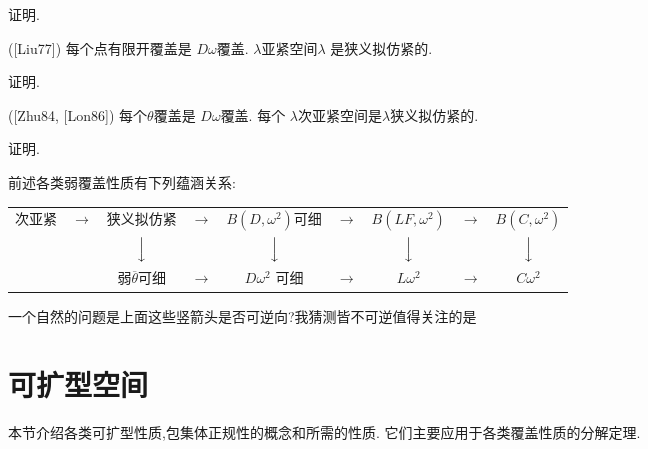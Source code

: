 \documentclass[main.tex]{subfiles}
\begin{document}
证明.

\begin{theorem}
	\textnormal{([Liu77])} 每个点有限开覆盖是 $D\omega$覆盖. $\lambda$亚紧空间$\lambda$
	是狭义拟仿紧的.
\end{theorem}

证明.


\begin{theorem}
	\textnormal{([Zhu84, [Lon86])} 每个$\theta$覆盖是 $D\omega$覆盖. 每个 $\lambda$次亚紧空间是$\lambda$狭义拟仿紧的.
\end{theorem}

证明.

前述各类弱覆盖性质有下列蕴涵关系\textnormal{:}

\vspace{.3cm}
\begin{tabular}{ccccccccc}
次亚紧 & $\longrightarrow$ & 狭义拟仿紧&$\longrightarrow$&$B(D, \omega^2)$可细&
   $\longrightarrow$ & $B(LF, \omega^2)$ & $\longrightarrow$ & $B(C, \omega^2)$ \\
   & & $\Big\downarrow$ & & $\Big\downarrow$  & & $\Big\downarrow$ &&$\Big\downarrow$ \\
 & & 弱$\overline{\theta}$可细&$\longrightarrow$&$D\omega^2$ 可细&
$\longrightarrow$ & $L\omega^2$ & $\longrightarrow$ & $C\omega^2$ \\
 \end{tabular}

\vspace{.3cm}

一个自然的问题是上面这些竖箭头是否可逆向?我猜测皆不可逆值得关注的是

\section{可扩型空间}\label{ch1.3}
本节介绍各类可扩型性质,包集体正规性的概念和所需的性质.
它们主要应用于各类覆盖性质的分解定理.
	
\end{document}
